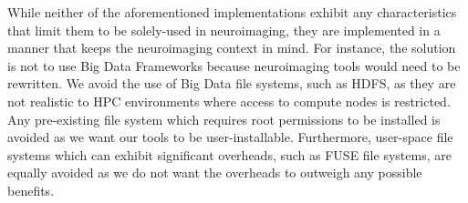 While neither of the aforementioned implementations exhibit any characteristics
that limit them to be solely-used in neuroimaging, they are implemented in a manner
that keeps the neuroimaging context in mind. For instance, the solution is not
to use Big Data Frameworks because neuroimaging tools would need to be
rewritten. We avoid the use of Big Data file systems, such as HDFS, as they are
not realistic to HPC environments where access to compute nodes is restricted.
Any pre-existing file system which requires root permissions to be installed is
avoided as we want our tools to be user-installable. Furthermore, user-space
file systems which can exhibit significant overheads, such as FUSE file systems,
are equally avoided as we do not want the overheads to outweigh any possible
benefits.